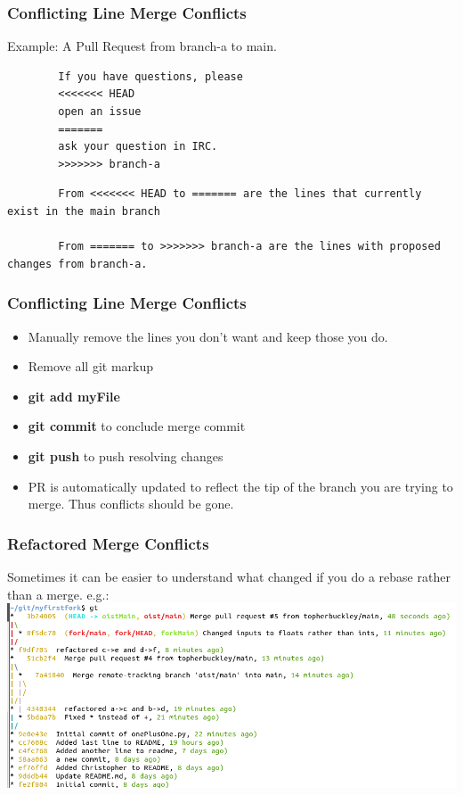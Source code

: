 \documentclass{beamer}
\begin{document}
\begin{frame}[fragile]
	\frametitle{Conflicting Line Merge Conflicts}
	Example: A Pull Request from branch-a to main. 
	\begin{lstlisting}
		If you have questions, please
		<<<<<<< HEAD
		open an issue
		=======
		ask your question in IRC.
		>>>>>>> branch-a
	\end{lstlisting}
	\begin{lstlisting}
		From <<<<<<< HEAD to ======= are the lines that currently exist in the main branch
	
		From ======= to >>>>>>> branch-a are the lines with proposed changes from branch-a. 
	\end{lstlisting}
\end{frame}
\note{
	\begin{itemize}
		\item 
	\end{itemize}
}

\begin{frame}[fragile]
	\frametitle{Conflicting Line Merge Conflicts}
		\begin{itemize}
			\item Manually remove the lines you don't want and keep those you do.
			\item Remove all git markup
			\item \textbf{git add myFile} 
			\item \textbf{git commit} to conclude merge commit
			\item \textbf{git push} to push resolving changes
			\item PR is automatically updated to reflect the tip of the branch you are trying to merge. Thus conflicts should be gone. 
		\end{itemize}
\end{frame}
\note{
	\begin{itemize}
		\item 
	\end{itemize}
}

\begin{frame}[fragile]
	\frametitle{Refactored Merge Conflicts}
	Sometimes it can be easier to understand what changed if you do a rebase rather than a merge. e.g.:
	\includegraphics[width=\textwidth]{rebaseVsMerge.png}
\end{frame}
\end{document}
